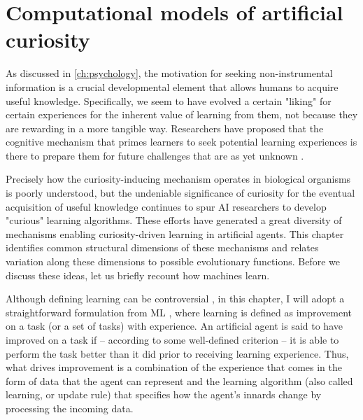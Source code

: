 \chapter{Computational models of artificial curiosity}\label{ch:ai}

As discussed in \autoref{ch:psychology}, the motivation for seeking non-instrumental information is a crucial developmental element that allows humans to acquire useful knowledge. Specifically, we seem to have evolved a certain "liking" for certain experiences for the inherent value of learning from them, not because they are rewarding in a more tangible way. Researchers have proposed that the cognitive mechanism that primes learners to seek potential learning experiences is there to prepare them for future challenges that are as yet unknown \cite{oudeyer_computational_2018,gopnik_childhood_2020}.

Precisely how the curiosity-inducing mechanism operates in biological organisms is poorly understood, but the undeniable significance of curiosity for the eventual acquisition of useful knowledge continues to spur \ac{AI} researchers to develop "curious" learning algorithms. These efforts have generated a great diversity of mechanisms enabling curiosity-driven learning in artificial agents. This chapter identifies common structural dimensions of these mechanisms and relates variation along these dimensions to possible evolutionary functions. Before we discuss these ideas, let us briefly recount how machines learn.

Although defining learning can be controversial \cite{barron_embracing_2015}, in this chapter, I will adopt a straightforward formulation from \ac{ML} \cite{jordan_machine_2015}, where learning is defined as improvement on a task (or a set of tasks) with experience. An artificial agent is said to have improved on a task if -- according to some well-defined criterion -- it is able to perform the task better than it did prior to receiving learning experience. Thus, what drives improvement is a combination of the experience that comes in the form of data that the agent can represent and the learning algorithm (also called learning, or update rule) that specifies how the agent’s innards change by processing the incoming data.

